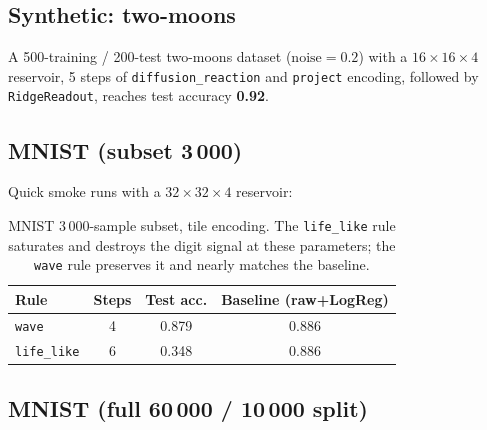 \documentclass[11pt,a4paper]{article}
\begin{document}
\subsection{Synthetic: two-moons}

A 500-training / 200-test two-moons dataset ($\mathrm{noise}=0.2$) with a
$16{\times}16{\times}4$ reservoir, 5 steps of \texttt{diffusion\_reaction} and
\texttt{project} encoding, followed by \texttt{RidgeReadout}, reaches
test accuracy \textbf{0.92}.

\subsection{MNIST (subset 3\,000)}

Quick smoke runs with a $32{\times}32{\times}4$ reservoir:

\begin{table}[h]
\centering
\begin{tabular}{lccc}
\toprule
Rule           & Steps & Test acc. & Baseline (raw+LogReg) \\
\midrule
\texttt{wave}              & 4 & 0.879 & 0.886 \\
\texttt{life\_like}        & 6 & 0.348 & 0.886 \\
\bottomrule
\end{tabular}
\caption{MNIST 3\,000-sample subset, tile encoding. The \texttt{life\_like}
rule saturates and destroys the digit signal at these parameters; the
\texttt{wave} rule preserves it and nearly matches the baseline.}
\end{table}

\subsection{MNIST (full 60\,000 / 10\,000 split)}
\end{document}
